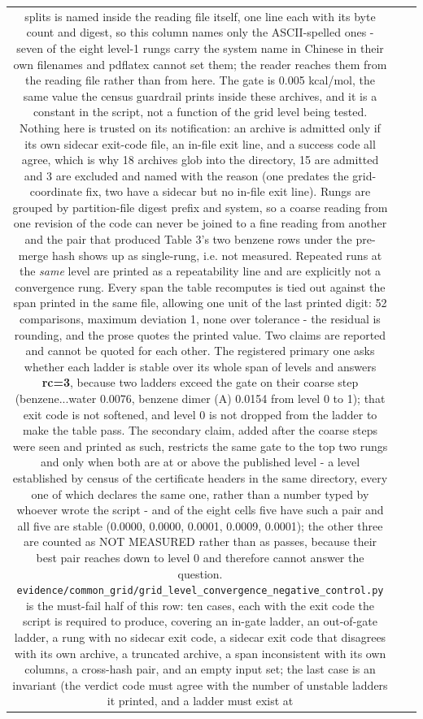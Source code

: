 \documentclass[11pt]{article}
\begin{document}
\begin{longtable}{c>{\raggedright\arraybackslash}p{}>{\raggedright\arraybackslash}p{}}
splits is named inside the reading file itself, one line each with its byte count and digest, so this column names only the ASCII-spelled ones - seven of the eight level-1 rungs carry the system name in Chinese in their own filenames and pdflatex cannot set them; the reader reaches them from the reading file rather than from here. The gate is 0.005 kcal/mol, the same value the census guardrail prints inside these archives, and it is a constant in the script, not a function of the grid level being tested. Nothing here is trusted on its notification: an archive is admitted only if its own sidecar exit-code file, an in-file exit line, and a success code all agree, which is why 18 archives glob into the directory, 15 are admitted and 3 are excluded and named with the reason (one predates the grid-coordinate fix, two have a sidecar but no in-file exit line). Rungs are grouped by partition-file digest prefix and system, so a coarse reading from one revision of the code can never be joined to a fine reading from another and the pair that produced Table 3's two benzene rows under the pre-merge hash shows up as single-rung, i.e. not measured. Repeated runs at the \emph{same} level are printed as a repeatability line and are explicitly not a convergence rung. Every span the table recomputes is tied out against the span printed in the same file, allowing one unit of the last printed digit: 52 comparisons, maximum deviation 1, none over tolerance - the residual is rounding, and the prose quotes the printed value. Two claims are reported and cannot be quoted for each other. The registered primary one asks whether each ladder is stable over its whole span of levels and answers \textbf{rc=3}, because two ladders exceed the gate on their coarse step (benzene...water 0.0076, benzene dimer (A) 0.0154 from level 0 to 1); that exit code is not softened, and level 0 is not dropped from the ladder to make the table pass. The secondary claim, added after the coarse steps were seen and printed as such, restricts the same gate to the top two rungs and only when both are at or above the published level - a level established by census of the certificate headers in the same directory, every one of which declares the same one, rather than a number typed by whoever wrote the script - and of the eight cells five have such a pair and all five are stable (0.0000, 0.0000, 0.0001, 0.0009, 0.0001); the other three are counted as NOT MEASURED rather than as passes, because their best pair reaches down to level 0 and therefore cannot answer the question. \texttt{evidence/\allowbreak{}common\_\allowbreak{}grid/\allowbreak{}grid\_\allowbreak{}level\_\allowbreak{}convergence\_\allowbreak{}negative\_\allowbreak{}control.py} is the must-fail half of this row: ten cases, each with the exit code the script is required to produce, covering an in-gate ladder, an out-of-gate ladder, a rung with no sidecar exit code, a sidecar exit code that disagrees with its own archive, a truncated archive, a span inconsistent with its own columns, a cross-hash pair, and an empty input set; the last case is an invariant (the verdict code must agree with the number of unstable ladders it printed, and a ladder must exist at 
\end{longtable}
\end{document}
